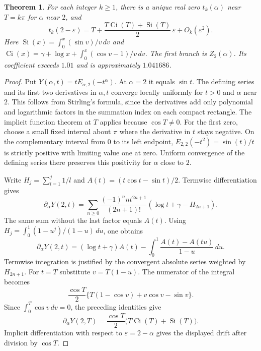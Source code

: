 \documentclass[11pt,a4paper]{article}
\newtheorem{theorem}{Theorem}[section]
\numberwithin{equation}{section}
\begin{document}
\begin{theorem}\label{th:drift}
For each integer $k\ge1$, there is a unique real zero $t_k(\alpha)$
near $T=k\pi$ for $\alpha$ near $2$, and
\[
 t_k(2-\varepsilon)=T+
 \frac{T\operatorname{Ci}(T)+\operatorname{Si}(T)}{2}\,
 \varepsilon+O_k(\varepsilon^2).
\]
Here $\operatorname{Si}(x)=\int_0^x (\sin v)/v\,dv$ and
$\operatorname{Ci}(x)=\gamma+\log x+
 \int_0^x(\cos v-1)/v\,dv$. The first branch is $Z_2(\alpha)$.
Its coefficient exceeds $1.01$ and is approximately $1.041686$.
\end{theorem}
\begin{proof}
Put $Y(\alpha,t)=t E_{\alpha,2}(-t^\alpha)$. At $\alpha=2$ it equals
$\sin t$. The defining series and its first two derivatives in
$\alpha,t$ converge locally uniformly for $t>0$ and $\alpha$ near
$2$. This follows from Stirling's formula, since the derivatives add
only polynomial and logarithmic factors in the summation index on
each compact rectangle. The implicit function theorem at $T$ applies
because $\cos T\ne0$. For the first zero, choose a small fixed interval
about $\pi$ where the derivative in $t$ stays negative. On the
complementary interval from $0$ to its left endpoint,
$E_{2,2}(-t^2)=\sin(t)/t$ is strictly positive with limiting value one
at zero. Uniform convergence of the defining series there preserves
this positivity for $\alpha$ close to $2$.

Write $H_j=\sum_{l=1}^j1/l$ and
$A(t)=(t\cos t-\sin t)/2$. Termwise differentiation gives
\[
 \partial_\alpha Y(2,t)=
 \sum_{n\ge0}\frac{(-1)^n n t^{2n+1}}{(2n+1)!}
         (\log t+\gamma-H_{2n+1}).
\]
The same sum without the last factor equals $A(t)$.
Using $H_j=\int_0^1(1-u^j)/(1-u)\,du$, one obtains
\[
 \partial_\alpha Y(2,t)=(\log t+\gamma)A(t)
       -\int_0^1\frac{A(t)-A(tu)}{1-u}\,du.
\]
Termwise integration is justified by the convergent absolute series
weighted by $H_{2n+1}$. For $t=T$ substitute $v=T(1-u)$. The numerator
of the integral becomes
\[
 \frac{\cos T}{2}\{T(1-\cos v)+v\cos v-\sin v\}.
\]
Since $\int_0^T\cos v\,dv=0$, the preceding identities give
\[
 \partial_\alpha Y(2,T)=\frac{\cos T}{2}
       \bigl(T\operatorname{Ci}(T)+\operatorname{Si}(T)\bigr).
\]
Implicit differentiation with respect to $\varepsilon=2-\alpha$ gives
the displayed drift after division by $\cos T$.


\end{proof}
\end{document}
